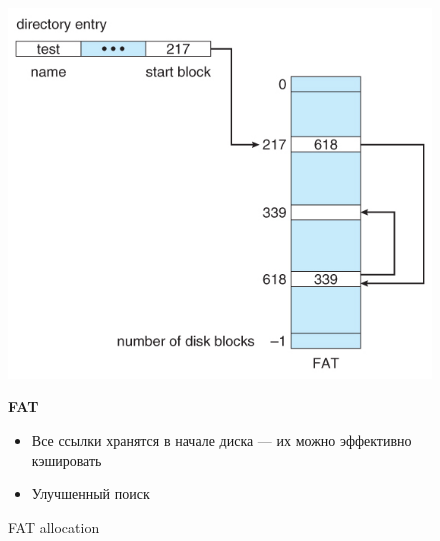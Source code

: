 \documentclass[../../lectures.tex]{subfiles}
\begin{document}
\begin{figure}[H]
\begin{minipage}[c]{0.47\linewidth}
\centering
\includegraphics[width=\textwidth]{images/fat-table.jpg}
\caption{FAT allocation}
\end{minipage}
\hspace{0.5cm}
\begin{minipage}[c]{0.5\linewidth}
\centering
\textbf{FAT}
\begin{itemize}
    \item Все ссылки хранятся в начале диска --- их можно эффективно кэшировать
    \item Улучшенный поиск
\end{itemize}
\end{minipage}
\end{figure}
\end{document}
